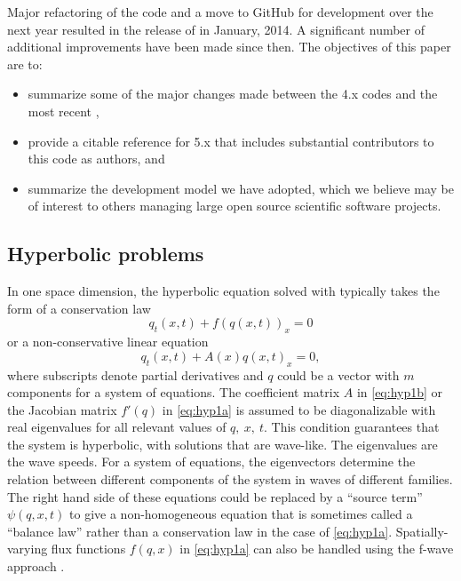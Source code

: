 Major refactoring of the code and a move to GitHub for development over the
next year resulted in the release of  in January, 2014. 
A significant number of additional improvements have been made since then.  The
objectives of this paper are to:
\begin{itemize} 
\item summarize some of the major changes made between the \clawpack
4.x codes and the most recent ,
\item provide a citable reference for \clawpack 5.x that includes
substantial contributors to this code as authors, and
\item summarize the development model we have adopted, which we believe
may be of interest to others managing large open source scientific software
projects.
\end{itemize} 

\subsection{Hyperbolic problems}\label{sec:hyp}

In one space dimension, the hyperbolic equation solved with
\clawpack typically takes the form of a conservation law
\begin{equation}\label{eq:hyp1a}
q_t(x,t) + f(q(x,t))_x = 0
\end{equation}
or a non-conservative linear equation
\begin{equation}\label{eq:hyp1b}
q_t(x,t) + A(x) q(x,t)_x = 0,
\end{equation} 
where subscripts denote partial derivatives and
$q$ could be a vector with $m$ components for a system of equations. 
The coefficient matrix $A$ in \cref{eq:hyp1b} or the Jacobian matrix 
$f'(q)$ in \cref{eq:hyp1a} is assumed to be diagonalizable with real eigenvalues
for all relevant values of $q,~x,~t$. 
This condition
guarantees that the system is hyperbolic, with solutions that are wave-like.  
The eigenvalues are the wave speeds.  For a system of equations,
the eigenvectors determine the relation between different components of the
system in waves of different families.  The right hand side of these
equations could be replaced by a ``source term'' $\psi(q,x,t)$ to give a
non-homogeneous equation that is sometimes called a ``balance law'' rather
than a conservation law in the case of \cref{eq:hyp1a}.
Spatially-varying flux functions $f(q,x)$ in \cref{eq:hyp1a} can also be handled
using the f-wave approach \cite{db-rjl-sm-jr:vcflux}.

